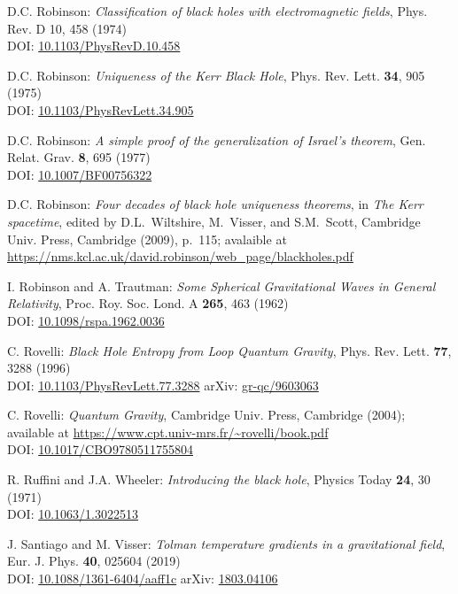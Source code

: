 \begin{thebibliography}{123}
D.C. Robinson:
{\em Classification of black holes with electromagnetic fields},
Phys. Rev. D 10, 458 (1974)\\
DOI: \href{https://doi.org/10.1103/PhysRevD.10.458}{10.1103/PhysRevD.10.458}

D.C. Robinson:
{\em Uniqueness of the Kerr Black Hole},
Phys. Rev. Lett. {\bf 34}, 905 (1975)\\
DOI: \href{https://doi.org/10.1103/PhysRevLett.34.905}{10.1103/PhysRevLett.34.905}

D.C. Robinson:
{\em A simple proof of the generalization of Israel's theorem},
Gen. Relat. Grav. {\bf 8}, 695 (1977)\\
DOI: \href{https://doi.org/10.1007/BF00756322}{10.1007/BF00756322}

D.C. Robinson:
{\em Four decades of black hole uniqueness theorems},
in {\em The Kerr spacetime}, edited by D.L.~Wiltshire, M.~Visser, and S.M.~Scott,
Cambridge Univ. Press, Cambridge (2009), p.~115; avalaible at\\
\url{https://nms.kcl.ac.uk/david.robinson/web_page/blackholes.pdf}

I. Robinson and A. Trautman:
{\em Some Spherical Gravitational Waves in General Relativity},
Proc. Roy. Soc. Lond. A {\bf 265}, 463 (1962)\\
DOI: \href{https://doi.org/10.1098/rspa.1962.0036}{10.1098/rspa.1962.0036}

C. Rovelli:
{\em Black Hole Entropy from Loop Quantum Gravity},
Phys. Rev. Lett. {\bf 77}, 3288 (1996)\\
DOI: \href{https://doi.org/10.1103/PhysRevLett.77.3288}{10.1103/PhysRevLett.77.3288}\hfill
arXiv: \href{https://arxiv.org/abs/gr-qc/9603063}{gr-qc/9603063}

C. Rovelli:
{\em Quantum Gravity},
Cambridge Univ. Press, Cambridge (2004); available at
\url{https://www.cpt.univ-mrs.fr/~rovelli/book.pdf}\\
DOI: \href{https://doi.org/10.1017/CBO9780511755804}{10.1017/CBO9780511755804}

R. Ruffini and J.A. Wheeler:
{\em Introducing the black hole},
Physics Today {\bf 24}, 30 (1971)\\
DOI: \href{https://doi.org/10.1063/1.3022513}{10.1063/1.3022513}

J. Santiago and M. Visser:
{\em Tolman temperature gradients in a gravitational field},
Eur. J. Phys. {\bf 40}, 025604 (2019)\\
DOI: \href{https://doi.org/10.1088/1361-6404/aaff1c}{10.1088/1361-6404/aaff1c}\hfill
arXiv: \href{https://arxiv.org/abs/1803.04106}{1803.04106}


\end{thebibliography}
